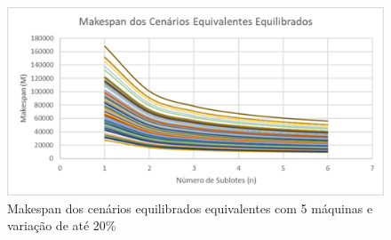 \begin{figure}[!ht]
    \centering
    \includegraphics[width=12cm]{Resultados/Figuras/Meq05_20}
    \caption{Makespan dos cenários equilibrados equivalentes com 5 máquinas e variação de até 20\%}
    \label{fig:Meq05_20}
\end{figure}